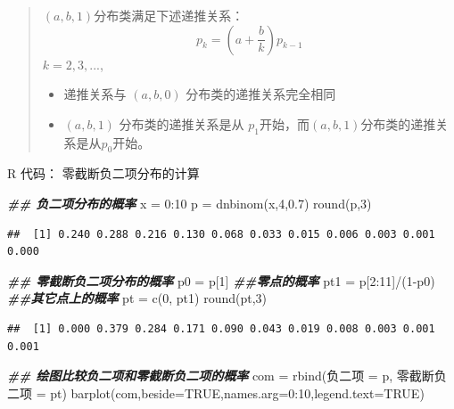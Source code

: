 \documentclass[
]{book}
\newenvironment{Shaded}{\begin{snugshade}}{\end{snugshade}}
\newcommand{\AttributeTok}[1]{\textcolor[rgb]{0.77,0.63,0.00}{#1}}
\newcommand{\ConstantTok}[1]{\textcolor[rgb]{0.00,0.00,0.00}{#1}}
\newcommand{\DecValTok}[1]{\textcolor[rgb]{0.00,0.00,0.81}{#1}}
\newcommand{\DocumentationTok}[1]{\textcolor[rgb]{0.56,0.35,0.01}{\textbf{\textit{#1}}}}
\newcommand{\FloatTok}[1]{\textcolor[rgb]{0.00,0.00,0.81}{#1}}
\newcommand{\FunctionTok}[1]{\textcolor[rgb]{0.00,0.00,0.00}{#1}}
\newcommand{\NormalTok}[1]{#1}
\newcommand{\OtherTok}[1]{\textcolor[rgb]{0.56,0.35,0.01}{#1}}
\newcommand{\SpecialCharTok}[1]{\textcolor[rgb]{0.00,0.00,0.00}{#1}}
\begin{document}
\begin{quote}
\((a,b,1)\)分布类满足下述递推关系： \[p_k=(a+\frac{b}{k})p_{k-1}\] \(k=2,3,...\),

\begin{itemize}
\item
  递推关系与 \((a,b,0)\) 分布类的递推关系完全相同
\item
  \((a,b,1)\) 分布类的递推关系是从 \(p_1\)开始，而\((a,b,1)\)分布类的递推关系是从\(p_0\)开始。
\end{itemize}
\end{quote}

R 代码： 零截断负二项分布的计算

\begin{Shaded}
\begin{Highlighting}[]
\DocumentationTok{\#\# 负二项分布的概率}
\NormalTok{x }\OtherTok{=} \DecValTok{0}\SpecialCharTok{:}\DecValTok{10}
\NormalTok{p }\OtherTok{=} \FunctionTok{dnbinom}\NormalTok{(x,}\DecValTok{4}\NormalTok{,}\FloatTok{0.7}\NormalTok{)}
\FunctionTok{round}\NormalTok{(p,}\DecValTok{3}\NormalTok{)}
\end{Highlighting}
\end{Shaded}

\begin{verbatim}
##  [1] 0.240 0.288 0.216 0.130 0.068 0.033 0.015 0.006 0.003 0.001 0.000
\end{verbatim}

\begin{Shaded}
\begin{Highlighting}[]
\DocumentationTok{\#\# 零截断负二项分布的概率}
\NormalTok{p0 }\OtherTok{=}\NormalTok{ p[}\DecValTok{1}\NormalTok{]   }\DocumentationTok{\#\#零点的概率}
\NormalTok{pt1 }\OtherTok{=}\NormalTok{ p[}\DecValTok{2}\SpecialCharTok{:}\DecValTok{11}\NormalTok{]}\SpecialCharTok{/}\NormalTok{(}\DecValTok{1}\SpecialCharTok{{-}}\NormalTok{p0)  }\DocumentationTok{\#\#其它点上的概率}
\NormalTok{pt }\OtherTok{=} \FunctionTok{c}\NormalTok{(}\DecValTok{0}\NormalTok{, pt1)}
\FunctionTok{round}\NormalTok{(pt,}\DecValTok{3}\NormalTok{)}
\end{Highlighting}
\end{Shaded}

\begin{verbatim}
##  [1] 0.000 0.379 0.284 0.171 0.090 0.043 0.019 0.008 0.003 0.001 0.001
\end{verbatim}

\begin{Shaded}
\begin{Highlighting}[]
\DocumentationTok{\#\# 绘图比较负二项和零截断负二项的概率}
\NormalTok{com }\OtherTok{=} \FunctionTok{rbind}\NormalTok{(负二项 }\OtherTok{=}\NormalTok{ p, 零截断负二项 }\OtherTok{=}\NormalTok{ pt)}
\FunctionTok{barplot}\NormalTok{(com,}\AttributeTok{beside=}\ConstantTok{TRUE}\NormalTok{,}\AttributeTok{names.arg=}\DecValTok{0}\SpecialCharTok{:}\DecValTok{10}\NormalTok{,}\AttributeTok{legend.text=}\ConstantTok{TRUE}\NormalTok{)}
\end{Highlighting}
\end{Shaded}
\end{document}
